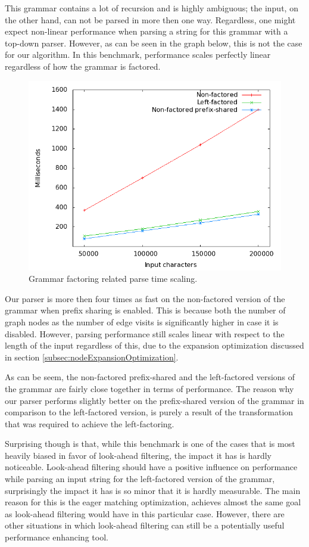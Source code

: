 \documentclass[a4paper,10pt]{article}
\begin{document}
This grammar contains a lot of recursion and is highly ambiguous; the input, on the other hand, can not be parsed in more then one way. Regardless, one might expect non-linear performance when parsing a string for this grammar with a top-down parser. However, as can be seen in the graph below, this is not the case for our algorithm. In this benchmark, performance scales perfectly linear regardless of how the grammar is factored.

\begin{figure}[H]
\centering
\includegraphics[scale=0.4]{grammar-factoring.png}
\caption{Grammar factoring related parse time scaling.}
\end{figure}

Our parser is more then four times as fast on the non-factored version of the grammar when prefix sharing is enabled. This is because both the number of graph nodes as the number of edge visits is significantly higher in case it is disabled. However, parsing performance still scales linear with respect to the length of the input regardless of this, due to the expansion optimization discussed in section \ref{subsec:nodeExpansionOptimization}.

As can be seem, the non-factored prefix-shared and the left-factored versions of the grammar are fairly close together in terms of performance. The reason why our parser performs slightly better on the prefix-shared version of the grammar in comparison to the left-factored version, is purely a result of the transformation that was required to achieve the left-factoring.

Surprising though is that, while this benchmark is one of the cases that is most heavily biased in favor of look-ahead filtering, the impact it has is hardly noticeable. Look-ahead filtering should have a positive influence on performance while parsing an input string for the left-factored version of the grammar, surprisingly the impact it has is so minor that it is hardly measurable. The main reason for this is the eager matching optimization, achieves almost the same goal as look-ahead filtering would have in this particular case. However, there are other situations in which look-ahead filtering can still be a potentially useful performance enhancing tool.
\end{document}
